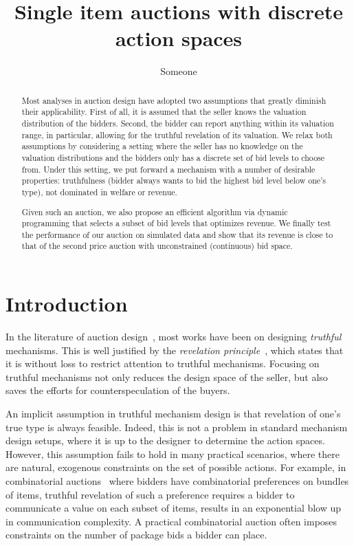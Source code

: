 \documentclass[letterpaper]{article}
\title {Single item auctions with discrete action spaces}
\author {Someone}
\begin{document}
%

\maketitle
\begin{abstract}
Most analyses in auction design have adopted two assumptions that greatly diminish their applicability. First of all, it is assumed that the seller knows the valuation distribution of the bidders. Second, the bidder can report anything within its valuation range, in particular, allowing for the truthful revelation of its valuation. We relax both assumptions by considering a setting where the seller has no knowledge on the valuation distributions and the bidders only has a discrete set of bid levels to choose from. Under this setting, we put forward a mechanism with a number of desirable properties: truthfulness (bidder always wants to bid the highest bid level below one's type), not dominated in welfare or revenue.

Given such an auction, we also propose an efficient algorithm via dynamic programming that selects a subset of bid levels that optimizes revenue. We finally test the performance of our auction on simulated data and show that its revenue is close to that of the second price auction with unconstrained (continuous) bid space.


\end{abstract}

\section{Introduction}

In the literature of auction design~\cite{Milgron2004,krishna2009auction,shoham09}, most works have been on designing {\em truthful} mechanisms. This is well justified by the {\em revelation principle}~\cite{Myerson81}, which states that it is without loss to restrict attention to truthful mechanisms. Focusing on truthful mechanisms not only reduces the design space of the seller, but also saves the efforts for counterspeculation of the buyers.

An implicit assumption in truthful mechanism design is that revelation of one's true type is always feasible. Indeed, this is not a problem in standard mechanism design setups, where it is up to the designer to determine the action spaces. However, this assumption fails to hold in many practical scenarios, where there are natural, exogenous constraints on the set of possible actions. For example, in combinatorial auctions~\cite{sandholm02algorithm} where bidders have combinatorial preferences on bundles of items, truthful revelation of such a preference requires a bidder to communicate a value on each subset of items, results in an exponential blow up in communication complexity. A practical combinatorial auction often imposes constraints on the number of package bids a bidder can place.
\end{document}

